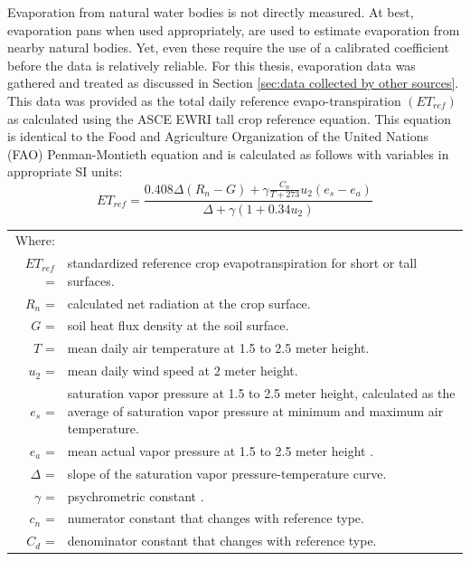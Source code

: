 Evaporation from natural water bodies is not directly measured. At best, evaporation pans when used appropriately, are used to estimate evaporation from nearby natural bodies.  Yet, even these require the use of a calibrated coefficient before the data is relatively reliable.  For this thesis, evaporation data was gathered and treated as discussed in Section \ref{sec:data collected by other sources}.  This data was provided as the total daily reference evapo-transpiration $ \left( ET_{ref} \right) $ as calculated using the ASCE EWRI tall crop reference equation.  This equation is identical to the Food and Agriculture Organization of the United Nations (FAO) Penman-Montieth equation \parencite{walter2000asce,FAO56} and is calculated as follows with variables in appropriate SI units:
\begin{equation}
\label{eq:ET}
	ET_{ref}=\frac{0.408\Delta(R_n-G)+\gamma \displaystyle \frac{C_n}{T+273}u_2(e_s-e_a)}{\Delta+\gamma(1+0.34u_2)}
\end{equation}
\begin{tabular}{r p{5.5in}}
Where: &\\
$ET_{ref}$ =&standardized reference crop evapotranspiration for short or tall surfaces. \\
$R_n$ =&calculated net radiation at the crop surface. \\
$G$ =&soil heat flux density at the soil surface. \\
$T$ =&mean daily air temperature at 1.5 to 2.5 meter height. \\
$u_2$ =&mean daily wind speed at 2 meter height. \\
$e_s$ =&saturation vapor pressure at 1.5 to 2.5 meter height, calculated as the
average of saturation vapor pressure at minimum and maximum air temperature. \\
$e_a$ =&mean actual vapor pressure at 1.5 to 2.5 meter height . \\
$\Delta$ =&slope of the saturation vapor pressure-temperature curve. \\
$\gamma$ =&psychrometric constant . \\
$c_n$ =&numerator constant that changes with reference type. \\
$C_d$ =&denominator constant that changes with reference type. \\
\end{tabular}\\


